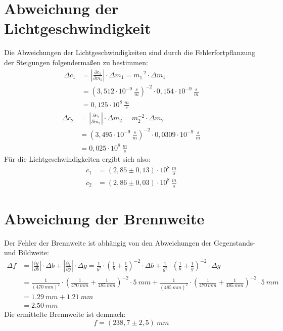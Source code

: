 \section{Abweichung der Lichtgeschwindigkeit}
Die Abweichungen der Lichtgeschwindigkeiten sind durch die Fehlerfortpflanzung der Steigungen folgendermaßen zu bestimmen:
\begin{align}
    \Delta c_{1}    &= \left\vert \frac{\partial c_{1}}{\partial m_{1}} \right\vert \cdot \Delta m_{1} = m_{1}^{-2} \cdot \Delta m_{1} \nonumber \\
                    &= \left( 3,512 \cdot 10^{-9} \SI{}{\frac{s}{m}} \right)^{-2} \cdot 0,154\cdot 10^{-9} \SI{}{\frac{s}{m}} \nonumber \\
                    &= 0,125\cdot 10^{8} \SI{}{\frac{m}{s}}
\end{align}
\begin{align}
    \Delta c_{2}    &= \left\vert \frac{\partial c_{2}}{\partial m_{2}} \right\vert \cdot \Delta m_{2} = m_{2}^{-2} \cdot \Delta m_{2} \nonumber \\
                    &= \left(3,495\cdot 10^{-9}\SI{}{\frac{s}{m}}\right)^{-2} \cdot 0,0309 \cdot 10^{-9} \SI{}{\frac{s}{m}} \nonumber \\
                    &= 0,025\cdot 10^{8} \SI{}{\frac{m}{s}}
\end{align}
Für die Lichtgeschwindigkeiten ergibt sich also:
\begin{align}
    c_{1} &= (2,85 \pm 0,13)\cdot 10^{8}\SI{}{\frac{m}{s}}\\
    c_{2} &= (2,86 \pm 0,03)\cdot 10^{8}\SI{}{\frac{m}{s}}
\end{align}
%
\section{Abweichung der Brennweite}
Der Fehler der Brennweite ist abhängig von den Abweichungen der Gegenstands- und Bildweite:
\begin{align}
    \Delta f    &= \left\vert \frac{\partial f}{\partial b} \right\vert \cdot \Delta b + \left\vert \frac{\partial f}{\partial g} \right\vert \cdot \Delta g = \frac{1}{b^{2}} \cdot \left(\frac{1}{b}+\frac{1}{g} \right)^{-2} \cdot \Delta b + \frac{1}{g^{2}} \cdot \left(\frac{1}{b}+\frac{1}{g} \right)^{-2} \cdot \Delta g \nonumber \\
                &= \frac{1}{(\SI{470}{mm})^{2}} \cdot \left(\frac{1}{\SI{470}{mm}}+\frac{1}{\SI{485}{mm}} \right)^{-2} \cdot \SI{5}{mm} + \frac{1}{(\SI{485}{mm})^{2}} \cdot \left(\frac{1}{\SI{470}{mm}}+\frac{1}{\SI{485}{mm}} \right)^{-2} \cdot \SI{5}{mm} \nonumber \\
                &=\SI{1,29}{mm}+\SI{1,21}{mm} \nonumber \\
                &=\SI{2,50}{mm}
\end{align}
Die ermittelte Brennweite ist demnach:
\begin{equation}
    f=(238,7 \pm 2,5)\SI{}{mm}
\end{equation}